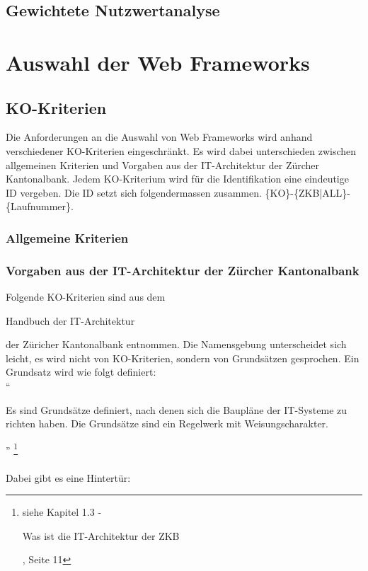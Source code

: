 \documentclass[abstracton, listof=totocnumbered,
bibliography=totocnumbered]{scrreprt}
\begin{document}
  \subsection{Gewichtete Nutzwertanalyse}
    
  \section{Auswahl der Web Frameworks}
    
  \subsection{KO-Kriterien}
  
  Die Anforderungen an die Auswahl von Web Frameworks wird anhand verschiedener
  KO-Kriterien eingeschränkt. Es wird dabei unterschieden zwischen allgemeinen
  Kriterien und Vorgaben aus der IT-Architektur der Zürcher Kantonalbank. Jedem
  KO-Kriterium wird für die Identifikation eine eindeutige ID vergeben. Die ID
  setzt sich folgendermassen zusammen. \{KO\}-\{ZKB|ALL\}-\{Laufnummer\}.
  
  \subsubsection{Allgemeine Kriterien}
  
  \subsubsection{Vorgaben aus der IT-Architektur der Zürcher Kantonalbank}
  
  Folgende KO-Kriterien sind aus dem \begin{itshape}Handbuch der
  IT-Architektur\end{itshape}\cite{ZkbHandbuchDerItArchitektur} der Züricher
  Kantonalbank entnommen. Die Namensgebung unterscheidet sich leicht, es wird
  nicht von KO-Kriterien, sondern von Grundsätzen gesprochen. Ein Grundsatz
  wird wie folgt definiert:\\
  
  ``\begin{itshape}Es sind Grundsätze definiert, nach denen sich die Baupläne
  der IT-Systeme zu richten haben. Die Grundsätze sind ein Regelwerk mit
  Weisungscharakter.\end{itshape}''
  \footnote{siehe Kapitel 1.3 - \begin{itshape}Was ist die IT-Architektur der
  ZKB\end{itshape}, Seite 11}
  \\
  \\
  \noindent
  Dabei gibt es eine Hintertür:\\
\end{document}
